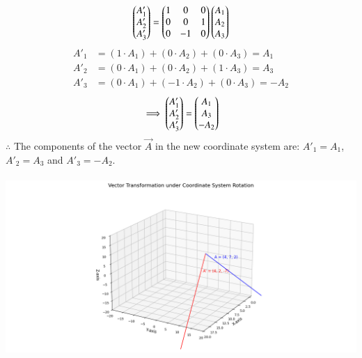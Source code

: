 \documentclass[journal]{IEEEtran}
\begin{document}
\begin{align}
    \begin{pmatrix}A'_1 \\ A'_2 \\ A'_3\end{pmatrix}  = \begin{pmatrix}1 & 0 & 0 \\ 0 & 0 & 1 \\ 0 & -1 & 0\end{pmatrix}   \begin{pmatrix} A_1 \\ A_2 \\ A_3\end{pmatrix}  
\end{align}
\begin{align}
A'_1 &= (1 \cdot A_1) + (0 \cdot A_2) + (0 \cdot A_3) = A_1 \\
A'_2 &= (0 \cdot A_1) + (0 \cdot A_2) + (1 \cdot A_3) = A_3 \\
A'_3 &= (0 \cdot A_1) + (-1 \cdot A_2) + (0 \cdot A_3) = -A_2
\end{align}
\begin{align}
\implies \begin{pmatrix}A'_1 \\ A'_2 \\ A'_3\end{pmatrix} =\begin{pmatrix} A_1 \\ A_3 \\ -A_2\end{pmatrix} 
\end{align}
$\therefore$ The components of the vector $\vec{A}$ in the new coordinate system are:
$A'_1 = A_1$, $A'_2 = A_3$ and $A'_3 = -A_2$.\\\\
    \centering   \includegraphics[width=\columnwidth, height=1\textheight, keepaspectratio]{figs/fig1.png} 
\end{document}

